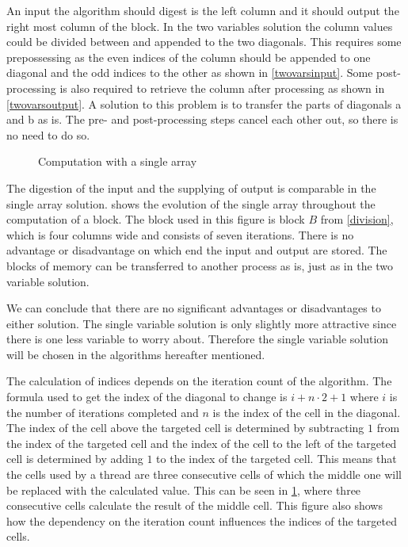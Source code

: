 An input the algorithm should digest is the left column and it should output the right most column of the block.
In the two variables solution the column values could be divided between and appended to the two diagonals.
This requires some prepossessing as the even indices of the column should be appended to one diagonal and the odd indices to the other as shown in \cref{twovarsinput}.
Some post-processing is also required to retrieve the column after processing as shown in \cref{twovarsoutput}.
A solution to this problem is to transfer the parts of diagonals a and b as is.
The pre- and post-processing steps cancel each other out, so there is no need to do so.

\begin{figure}[ht]
    \centering
    
    \caption{Computation with a single array} \label{singlevar}
\end{figure}

The digestion of the input and the supplying of output is comparable in the single array solution.
 shows the evolution of the single array throughout the computation of a block.
The block used in this figure is block $B$ from \cref{division}, which is four columns wide and consists of seven iterations.
There is no advantage or disadvantage on which end the input and output are stored.
The blocks of memory can be transferred to another process as is, just as in the two variable solution.

We can conclude that there are no significant advantages or disadvantages to either solution.
The single variable solution is only slightly more attractive since there is one less variable to worry about.
Therefore the single variable solution will be chosen in the algorithms hereafter mentioned.

The calculation of indices depends on the iteration count of the algorithm.
The formula used to get the index of the diagonal to change is $i + n \cdot 2 + 1$ where $i$ is the number of iterations completed and $n$ is the index of the cell in the diagonal.
The index of the cell above the targeted cell is determined by subtracting $1$ from the index of the targeted cell and the index of the cell to the left of the targeted cell is determined by adding $1$ to the index of the targeted cell.
This means that the cells used by a thread are three consecutive cells of which the middle one will be replaced with the calculated value.
This can be seen in \cref{singlevar}, where three consecutive cells calculate the result of the middle cell.
This figure also shows how the dependency on the iteration count influences the indices of the targeted cells.


